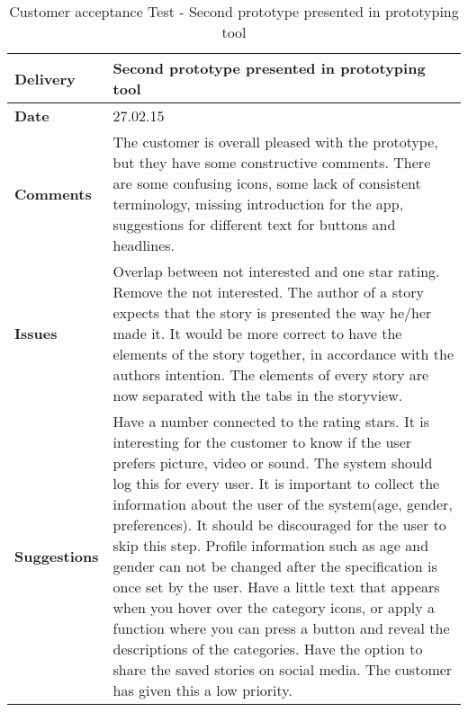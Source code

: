 \renewcommand{\arraystretch}{2}%
\begin{center}
	\begin{longtable}{ | p{4cm} | p{13cm} | }
		
		\caption[Customer acceptance test]{Customer acceptance Test - Second prototype presented in prototyping tool} \label{Tab:cattest2}\\
		\hline
		\textbf{Delivery} & Second prototype presented in prototyping tool\\ \hline
		\textbf{Date} & 27.02.15 \\ \hline 
		\textbf{Comments}&
		The customer is overall pleased with the prototype, but they have some constructive comments. 
		There are some confusing icons, some lack of consistent terminology, missing introduction for the app, suggestions for different text for buttons and headlines.
		\\ \hline
		\textbf{Issues} 	 &	
		Overlap between not interested and one star rating. Remove the not interested. The author of a story expects that the story is presented the way he/her made it. It would be more correct to have the elements of the story together, in accordance with the authors intention. The elements of every story are now separated with the tabs in the storyview. 	 	
		\\ \hline
		\textbf{Suggestions} &
		 Have a number connected to the rating stars. It is interesting for the customer to know if the user prefers picture, video or sound. The system should log this for every user. It is important to collect the information about the user of the system(age, gender, preferences). It should be discouraged for the user to skip this step. Profile information such as age and gender can not be changed after the specification is once set by the user. Have a little text that appears when you hover over the category icons, or apply a function where you can press a button and reveal the descriptions of the categories. Have the option to share the saved stories on social media. The customer has given this a low priority.
		\\ \hline
	\end{longtable}
\end{center}

